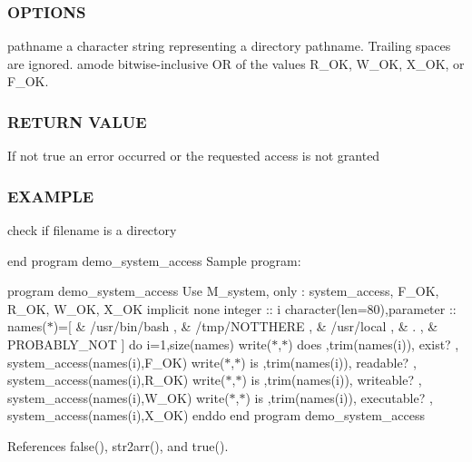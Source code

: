 \subsubsection*{O\+P\+T\+I\+O\+NS}

pathname a character string representing a directory pathname. Trailing spaces are ignored. amode bitwise-\/inclusive OR of the values R\+\_\+\+OK, W\+\_\+\+OK, X\+\_\+\+OK, or F\+\_\+\+OK.

\subsubsection*{R\+E\+T\+U\+RN V\+A\+L\+UE}

If not true an error occurred or the requested access is not granted

\subsubsection*{E\+X\+A\+M\+P\+LE}

check if filename is a directory

end program demo\+\_\+system\+\_\+access Sample program\+:

program demo\+\_\+system\+\_\+access Use M\+\_\+system, only \+: system\+\_\+access, F\+\_\+\+OK, R\+\_\+\+OK, W\+\_\+\+OK, X\+\_\+\+OK implicit none integer \+:\+: i character(len=80),parameter \+:\+: names($\ast$)=\mbox{[} \& \textquotesingle{}/usr/bin/bash \textquotesingle{}, \& \textquotesingle{}/tmp/\+N\+O\+T\+T\+H\+E\+RE \textquotesingle{}, \& \textquotesingle{}/usr/local \textquotesingle{}, \& \textquotesingle{}. \textquotesingle{}, \& \textquotesingle{}P\+R\+O\+B\+A\+B\+L\+Y\+\_\+\+N\+OT \textquotesingle{}\mbox{]} do i=1,size(names) write($\ast$,$\ast$)\textquotesingle{} does \textquotesingle{},trim(names(i)),\textquotesingle{} exist? \textquotesingle{}, system\+\_\+access(names(i),\+F\+\_\+\+O\+K) write($\ast$,$\ast$)\textquotesingle{} is \textquotesingle{},trim(names(i)),\textquotesingle{} readable? \textquotesingle{}, system\+\_\+access(names(i),\+R\+\_\+\+O\+K) write($\ast$,$\ast$)\textquotesingle{} is \textquotesingle{},trim(names(i)),\textquotesingle{} writeable? \textquotesingle{}, system\+\_\+access(names(i),\+W\+\_\+\+O\+K) write($\ast$,$\ast$)\textquotesingle{} is \textquotesingle{},trim(names(i)),\textquotesingle{} executable? \textquotesingle{}, system\+\_\+access(names(i),\+X\+\_\+\+O\+K) enddo end program demo\+\_\+system\+\_\+access 

References false(), str2arr(), and true().


